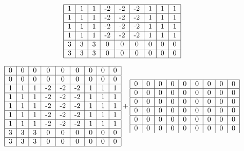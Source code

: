 \documentclass{article}
\begin{document}
\begin{equation}
\begin{tabular}{ | c | c | c | c | c | c | c | c | c | }
        \hline
        1 & 1 & 1 & -2 & -2 & -2 & 1 & 1 & 1 \\ 
        \hline
        1 & 1 & 1 & -2 & -2 & -2 & 1 & 1 & 1 \\ 
        \hline
        1 & 1 & 1 & -2 & -2 & -2 & 1 & 1 & 1 \\ 
        \hline
        1 & 1 & 1 & -2 & -2 & -2 & 1 & 1 & 1 \\ 
        \hline
        3 & 3 & 3 & 0 & 0 & 0 & 0 & 0 & 0 \\ 
        \hline
        3 & 3 & 3 & 0 & 0 & 0 & 0 & 0 & 0 \\ 
        \hline
    \end{tabular}
\end{equation}

\begin{equation}
    \begin{tabular}{ | c | c | c | c | c | c | c | c | c | }
        \hline
        0 & 0 & 0 & 0 & 0 & 0 & 0 & 0 & 0 \\ 
        \hline
        0 & 0 & 0 & 0 & 0 & 0 & 0 & 0 & 0 \\ 
        \hline
        1 & 1 & 1 & -2 & -2 & -2 & 1 & 1 & 1 \\ 
        \hline
        1 & 1 & 1 & -2 & -2 & -2 & 1 & 1 & 1 \\ 
        \hline
        1 & 1 & 1 & -2 & -2 & -2 & 1 & 1 & 1 \\ 
        \hline
        1 & 1 & 1 & -2 & -2 & -2 & 1 & 1 & 1 \\ 
        \hline
        1 & 1 & 1 & -2 & -2 & -2 & 1 & 1 & 1 \\ 
        \hline
        3 & 3 & 3 & 0 & 0 & 0 & 0 & 0 & 0 \\ 
        \hline
        3 & 3 & 3 & 0 & 0 & 0 & 0 & 0 & 0 \\ 
        \hline
    \end{tabular} + \begin{tabular}{ | c | c | c | c | c | c | c | c | c | }
        \hline
        0 & 0 & 0 & 0 & 0 & 0 & 0 & 0 & 0 \\ 
        \hline
        0 & 0 & 0 & 0 & 0 & 0 & 0 & 0 & 0 \\ 
        \hline
        0 & 0 & 0 & 0 & 0 & 0 & 0 & 0 & 0 \\ 
        \hline
        0 & 0 & 0 & 0 & 0 & 0 & 0 & 0 & 0 \\ 
        \hline
        0 & 0 & 0 & 0 & 0 & 0 & 0 & 0 & 0 \\ 
        \hline
        0 & 0 & 0 & 0 & 0 & 0 & 0 & 0 & 0 \\ 

\end{tabular}
\end{equation}
\end{document}
